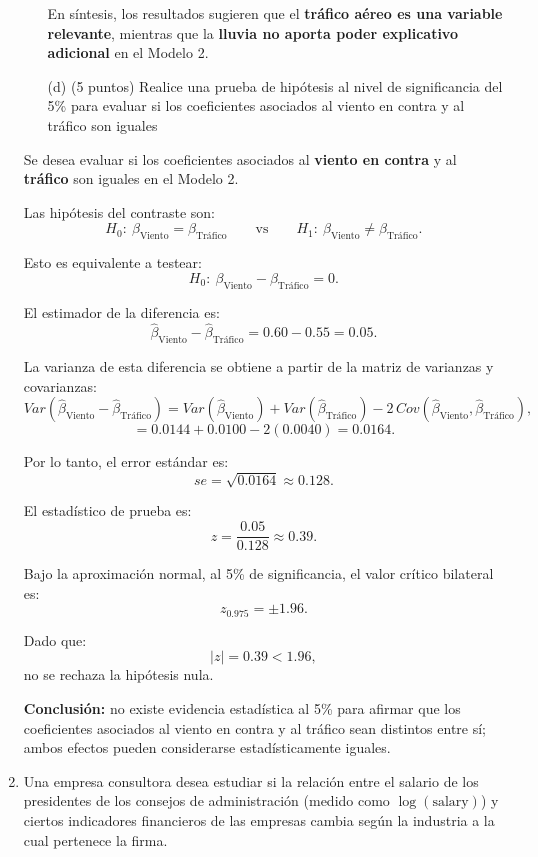 \documentclass[10pt,a4paper]{article}
\begin{document}
\begin{enumerate}
\begin{enumerate}
En síntesis, los resultados sugieren que el \textbf{tráfico aéreo es una variable relevante},
mientras que la \textbf{lluvia no aporta poder explicativo adicional} en el Modelo 2.

\color{black}
  \item[(d)] (5 puntos) Realice una prueba de hipótesis al nivel de significancia del 5\% para evaluar si los coeficientes asociados al viento en contra y al tráfico son iguales
\end{enumerate}
\color{blue}
Se desea evaluar si los coeficientes asociados al \textbf{viento en contra} y al
\textbf{tráfico} son iguales en el Modelo 2.

Las hipótesis del contraste son:
\[
H_0:\ \beta_{\text{Viento}} = \beta_{\text{Tráfico}}
\qquad \text{vs} \qquad
H_1:\ \beta_{\text{Viento}} \neq \beta_{\text{Tráfico}}.
\]

Esto es equivalente a testear:
\[
H_0:\ \beta_{\text{Viento}} - \beta_{\text{Tráfico}} = 0.
\]

El estimador de la diferencia es:
\[
\hat\beta_{\text{Viento}} - \hat\beta_{\text{Tráfico}}
= 0.60 - 0.55 = 0.05.
\]

La varianza de esta diferencia se obtiene a partir de la matriz de varianzas y covarianzas:
\[
Var(\hat\beta_{\text{Viento}} - \hat\beta_{\text{Tráfico}})
= Var(\hat\beta_{\text{Viento}})
+ Var(\hat\beta_{\text{Tráfico}})
- 2\,Cov(\hat\beta_{\text{Viento}},\hat\beta_{\text{Tráfico}}),
\]
\[
= 0.0144 + 0.0100 - 2(0.0040) = 0.0164.
\]

Por lo tanto, el error estándar es:
\[
se = \sqrt{0.0164} \approx 0.128.
\]

El estadístico de prueba es:
\[
z = \frac{0.05}{0.128} \approx 0.39.
\]

Bajo la aproximación normal, al 5\% de significancia, el valor crítico bilateral es:
\[
z_{0.975} = \pm 1.96.
\]

Dado que:
\[
|z| = 0.39 < 1.96,
\]
no se rechaza la hipótesis nula.

\textbf{Conclusión:} no existe evidencia estadística al 5\% para afirmar que los coeficientes
asociados al viento en contra y al tráfico sean distintos entre sí; ambos efectos pueden
considerarse estadísticamente iguales.


\color{black}

    \item  Una empresa consultora desea estudiar si la relación entre el salario de los presidentes de los 
consejos de administración (medido como $\log(\text{salary})$) y ciertos indicadores financieros 
de las empresas cambia según la industria a la cual pertenece la firma.


\end{enumerate}
\end{document}
